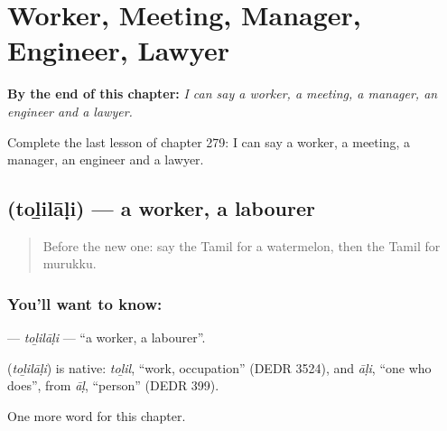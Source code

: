 
\chapter{Worker, Meeting, Manager, Engineer, Lawyer}
\label{ch:ta-worker-meeting-manager-engineer-lawyer}

\begin{chapteropening}
\textbf{By the end of this chapter:} \emph{I can say a worker, a meeting, a manager, an engineer and a lawyer.}

Complete the last lesson of chapter 279: I can say a worker, a meeting, a manager, an engineer and a lawyer.
\end{chapteropening}

\section[\texorpdfstring{\ta{தொழிலாளி} (toḻilāḷi)}{தொழிலாளி (toḻilāḷi)}]{ (toḻilāḷi) — a worker, a labourer}

\label{lesson:TA-C279-tolilali}



\begin{quote}
Before the new one: say the Tamil for a watermelon, then the Tamil for murukku.
\end{quote}

\subsection*{You'll want to know: }
\textbf{} — \emph{toḻilāḷi} — \textquotedblleft{}a worker, a labourer\textquotedblright{}.

\begin{cousinweb}
\textbf{} (\emph{toḻilāḷi}) is native: \emph{toḻil}, \textquotedblleft{}work, occupation\textquotedblright{} (DEDR 3524), and \emph{āḷi}, \textquotedblleft{}one who does\textquotedblright{}, from \emph{āḷ}, \textquotedblleft{}person\textquotedblright{} (DEDR 399).
\end{cousinweb}

\begin{grammarlens}[title={What you've built}]
One more word for this chapter.
\end{grammarlens}

